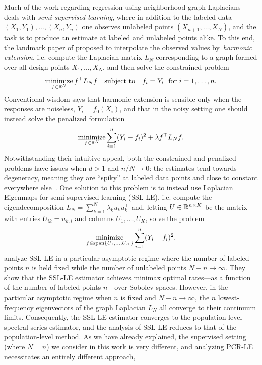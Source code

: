Much of the work regarding regression using neighborhood graph Laplacians deals with \emph{semi-supervised learning}, where in addition to the labeled data $(X_1,Y_1),\ldots,(X_n,Y_n)$ one observes unlabeled points $(X_{n + 1},\ldots,X_{N})$, and the task is to produce an estimate at labeled and unlabeled points alike. To this end, the landmark paper of \cite{zhu2003semisupervised} proposed to interpolate the observed values by~\emph{harmonic extension}, i.e. compute the Laplacian matrix $L_N$  corresponding to a graph formed over all design points $X_1,\ldots,X_N$, and then solve the constrained problem
\begin{equation*}
\mathop{\mathrm{minimize}}_{f \in \mathbb{R}^N} f^{\top} L_N f \quad \mathrm{subject\,\,to}~~~ f_i = Y_i~~\textrm{for $i = 1,\ldots,n$.}
\end{equation*}
Conventional wisdom says that harmonic extension is sensible only when the responses are noiseless, $Y_i = f_0(X_i)$, and that in the noisy setting one should instead solve the penalized formulation
\begin{equation}
\label{eqn:graph_laplacian_regularization_ssl}
\mathop{\mathrm{minimize}}_{f \in \mathbb{R}^N} \sum_{i = 1}^{n}(Y_i - f_i)^2 + \lambda f^{\top} L_N f.
\end{equation}
Notwithstanding their intuitive appeal, both the constrained and penalized problems have issues when $d > 1$ and $n/N \to 0$: the estimates tend towards degeneracy, meaning they are ``spiky'' at labeled data points and close to constant everywhere else~\citep{nadler09,calder2019b, calder2020}. One solution to this problem is to instead use Laplacian Eigenmaps for semi-supervised learning (SSL-LE), i.e. compute the eigendecomposition $L_N = \sum_{k = 1}^{N} \lambda_k u_k u_k^{\top}$ and, letting $U \in \mathbb{R}^{n \times K}$ be the matrix with entries $U_{ik} = u_{k,i}$ and columns $U_1,\ldots,U_K$, solve the problem
\begin{equation}
\label{eqn:laplacian_eigenmaps_ssl}
\mathop{\mathrm{minimize}}_{f \in \mathrm{span}\{U_1,\ldots,U_K\}} \sum_{i = 1}^{n}(Y_i - f_i)^2.
\end{equation}
\cite{zhou2011,lee2016} analyze SSL-LE in a particular asymptotic regime where the number of labeled points $n$ is held fixed while the number of unlabeled points $N - n \to \infty$. They show that the SSL-LE estimator achieves minimax optimal rates---as a function of the number of labeled points $n$---over Sobolev spaces. However, in the particular asymptotic regime when $n$ is fixed and $N - n \to \infty$, the $n$ lowest-frequency eigenvectors of the graph Laplacian $L_N$ all converge to their continuum limits. Consequently, the SSL-LE estimator converges to the population-level spectral series estimator, and the analysis of SSL-LE reduces to that of the population-level method. As we have already explained, the supervised setting (where $N = n$) we consider in this work is very different, and analyzing PCR-LE necessitates an entirely different approach, 

